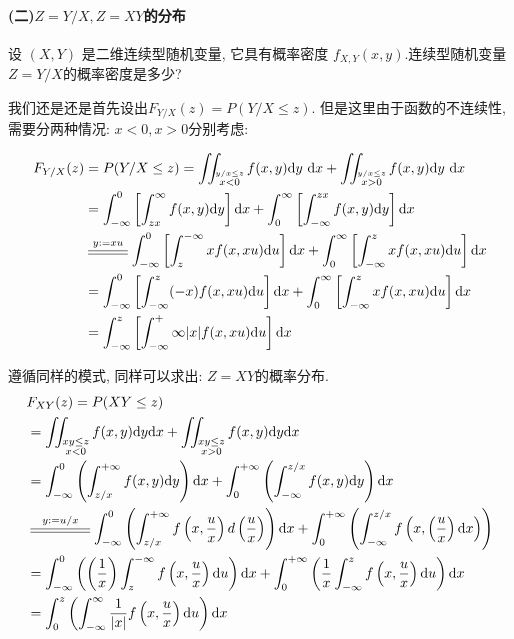 \paragraph{(二)$Z=Y/X,Z=XY$的分布}

设 $(X, Y)$ 是二维连续型随机变量, 它具有概率密度 $f_{X,Y}(x, y)$.连续型随机变量$Z=Y/X$的概率密度是多少?

我们还是还是首先设出$F_{Y/X}(z)=P(Y/X\leq z)$. 但是这里由于函数的不连续性, 需要分两种情况: $x<0, x>0$分别考虑:

$$
\begin{aligned}
F_{Y / X}(z) & =P(Y / X \leq z)=\iint_{\stackrel{y / x \leq z}{x<0}} f(x, y) \mathrm{d} y \mathrm{~d} x+\iint_{\stackrel{y / x \leq z}{x>0}} f(x, y) \mathrm{d} y \mathrm{~d} x \\
& =\int_{-\infty}^0\left[\int_{z x}^{\infty} f(x, y) \mathrm{d} y\right] \mathrm{d} x+\int_0^{\infty}\left[\int_{-\infty}^{z x} f(x, y) \mathrm{d} y\right] \mathrm{d} x \\
& \varsub{y:=xu}{1cm} \int_{-\infty}^0\left[\int_z^{-\infty} x f(x, x u) \mathrm{d} u\right] \mathrm{d} x+\int_0^{\infty}\left[\int_{-\infty}^z x f(x, x u) \mathrm{d} u\right] \mathrm{d} x \\
& =\int_{-\infty}^0\left[\int_{-\infty}^z(-x) f(x, x u) \mathrm{d} u\right] \mathrm{d} x+\int_0^{\infty}\left[\int_{-\infty}^z x f(x, x u) \mathrm{d} u\right] \mathrm{d} x \\
& =\int_{-\infty}^z\left[\int_{-\infty}^+\infty|x| f(x, x u) \mathrm{d} u\right] \mathrm{d} x
\end{aligned}
$$

遵循同样的模式, 同样可以求出: $Z=XY$的概率分布. 
$$
\begin{aligned} & F_{XY}(z)=P(XY\leq z)\\
 & =\iint_{\substack{xy\leq z\\
 x<0}}f(x,y)\dd y\dd x+\iint_{\substack{xy\leq z\\
 x>0}}f(x,y)\dd y\dd x\\
 & =\int_{-\infty}^{0}\left(\int_{z/x}^{+\infty}f(x,y)\dd y\right)\dd x+\int_{0}^{+\infty}\left(\int_{-\infty}^{z/x}f(x,y)\dd y\right)\dd x\\
 & \varsub{y:=u/x}{1.5cm}\int_{-\infty}^{0}\left(\int_{z/x}^{+\infty}f\left(x,\frac{u}{x}\right)d\left(\frac{u}{x}\right)\right)\dd x+\int_{0}^{+\infty}\left(\int_{-\infty}^{z/x}f\left(x,\left(\frac{u}{x}\right)\dd x\right)\right)\\
 & =\int_{-\infty}^{0}\left(\left(\frac{1}{x}\right)\int_{z}^{-\infty}f\left(x,\frac{u}{x}\right)\dd u\right)\dd x+\int_{0}^{+\infty}\left(\frac{1}{x}\int_{-\infty}^{z}f\left(x,\frac{u}{x}\right)\dd u\right)\dd x\\
 & =\int_{0}^{z}\left(\int_{-\infty}^{\infty}\frac{1}{|x|}f\left(x,\frac{u}{x}\right)\dd u\right)\dd x
\end{aligned}
$$

